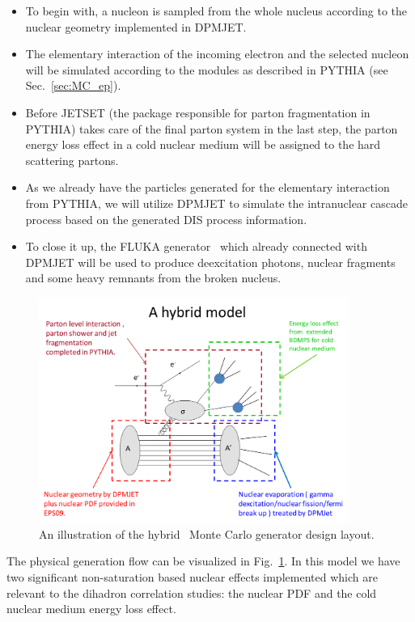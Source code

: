 \begin{itemize}
    \item To begin with, a nucleon is sampled from the whole nucleus according to the nuclear geometry implemented in DPMJET.
    \item The elementary interaction of the incoming electron and the selected nucleon will be simulated according to the modules as described in PYTHIA (see Sec.~\ref{sec:MC_ep}).
    \item Before JETSET (the package responsible for parton fragmentation in PYTHIA) takes care of the final parton system in the last step, the parton energy loss effect in a cold nuclear medium will be assigned to the hard scattering partons. 
    \item As we already have the particles generated for the elementary interaction from PYTHIA, we will utilize DPMJET to simulate the intranuclear cascade process based on the generated DIS process information.
    \item To close it up, the FLUKA generator~\cite{Ferrari:1995cq} which already connected with DPMJET will be used to produce deexcitation photons, nuclear fragments and some heavy remnants from the broken nucleus.
\end{itemize}

\begin{figure}
\centering
\includegraphics[width=0.9\textwidth]{plots/chpt5/eA_hybrid_layout.png} 
\caption[An illustration of the hybrid \eA\ Monte Carlo generator design layout] {
An illustration of the hybrid \eA\ Monte Carlo generator design layout. }
\label{fig:MC_hybrid_chart}
\end{figure}

The physical generation flow can be visualized in Fig.~\ref{fig:MC_hybrid_chart}.
In this model we have two significant non-saturation based nuclear effects implemented which are relevant to the dihadron correlation studies: the nuclear PDF and the cold nuclear medium energy loss effect.


